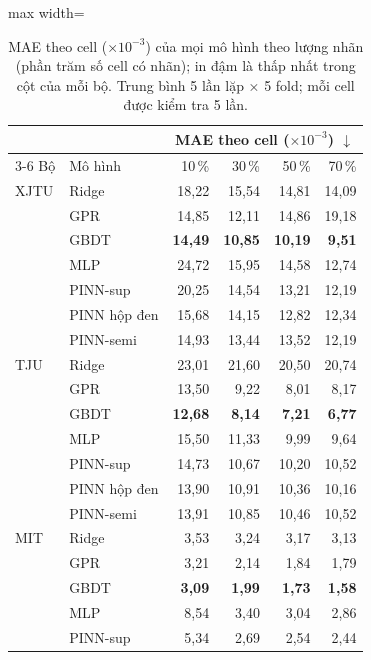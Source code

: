 \begin{table}[!htbp]\centering\small
\caption[MAE theo cell của mọi mô hình theo lượng nhãn]{MAE theo cell (×$10^{-3}$) của mọi mô hình theo lượng nhãn (phần trăm số cell có nhãn); in đậm là thấp nhất trong cột của mỗi bộ. Trung bình 5 lần lặp × 5 fold; mỗi cell được kiểm tra 5 lần.}\label{tab:big}
\begin{adjustbox}{max width=\textwidth}\begin{tabular}{llrrrr}\toprule
 & & \multicolumn{4}{c}{MAE theo cell ($\times10^{-3}$) $\downarrow$} \\\cmidrule(lr){3-6}
Bộ & Mô hình & 10\,\% & 30\,\% & 50\,\% & 70\,\% \\\midrule
XJTU & Ridge & 18{,}22 & 15{,}54 & 14{,}81 & 14{,}09 \\
 & GPR & 14{,}85 & 12{,}11 & 14{,}86 & 19{,}18 \\
 & GBDT & \textbf{14{,}49} & \textbf{10{,}85} & \textbf{10{,}19} & \textbf{9{,}51} \\
 & MLP & 24{,}72 & 15{,}95 & 14{,}58 & 12{,}74 \\
 & PINN-sup & 20{,}25 & 14{,}54 & 13{,}21 & 12{,}19 \\
 & PINN hộp đen & 15{,}68 & 14{,}15 & 12{,}82 & 12{,}34 \\
 & PINN-semi & 14{,}93 & 13{,}44 & 13{,}52 & 12{,}19 \\
\addlinespace[3pt]
TJU & Ridge & 23{,}01 & 21{,}60 & 20{,}50 & 20{,}74 \\
 & GPR & 13{,}50 & 9{,}22 & 8{,}01 & 8{,}17 \\
 & GBDT & \textbf{12{,}68} & \textbf{8{,}14} & \textbf{7{,}21} & \textbf{6{,}77} \\
 & MLP & 15{,}50 & 11{,}33 & 9{,}99 & 9{,}64 \\
 & PINN-sup & 14{,}73 & 10{,}67 & 10{,}20 & 10{,}52 \\
 & PINN hộp đen & 13{,}90 & 10{,}91 & 10{,}36 & 10{,}16 \\
 & PINN-semi & 13{,}91 & 10{,}85 & 10{,}46 & 10{,}52 \\
\addlinespace[3pt]
MIT & Ridge & 3{,}53 & 3{,}24 & 3{,}17 & 3{,}13 \\
 & GPR & 3{,}21 & 2{,}14 & 1{,}84 & 1{,}79 \\
 & GBDT & \textbf{3{,}09} & \textbf{1{,}99} & \textbf{1{,}73} & \textbf{1{,}58} \\
 & MLP & 8{,}54 & 3{,}40 & 3{,}04 & 2{,}86 \\
 & PINN-sup & 5{,}34 & 2{,}69 & 2{,}54 & 2{,}44 \\

\end{tabular}
\end{adjustbox}
\end{table}
